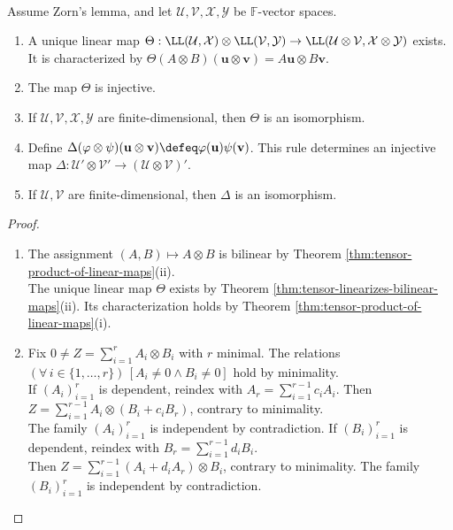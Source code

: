 \begin{theorem} \label{thm:tensor-product-of-map-spaces} \\
Assume Zorn's lemma, and let $\mathcal{U},\mathcal{V},\mathcal{X},\mathcal{Y}$ be $\mathbb{F}$-vector spaces.
\begin{enumerate}[label=(\roman*)]
\setlength{\itemsep}{0pt}
\item A unique linear map $\Theta:\LL(\mathcal{U},\mathcal{X})\otimes\LL(\mathcal{V},\mathcal{Y})\to\LL(\mathcal{U}\otimes\mathcal{V},\mathcal{X}\otimes\mathcal{Y})$ exists. It is characterized by $\Theta(A\otimes B)(\mathbf{u}\otimes\mathbf{v})=A\mathbf{u}\otimes B\mathbf{v}$.
\item The map $\Theta$ is injective.
\item If $\mathcal{U},\mathcal{V},\mathcal{X},\mathcal{Y}$ are finite-dimensional, then $\Theta$ is an isomorphism.
\item Define $\Delta(\varphi\otimes\psi)(\mathbf{u}\otimes\mathbf{v})\defeq\varphi(\mathbf{u})\psi(\mathbf{v})$. This rule determines an injective map $\Delta:\mathcal{U}'\otimes\mathcal{V}'\to(\mathcal{U}\otimes\mathcal{V})'$.
\item If $\mathcal{U},\mathcal{V}$ are finite-dimensional, then $\Delta$ is an isomorphism.
\end{enumerate}
\begin{proof}
\begin{enumerate}[label=(\roman*)]
\setlength{\itemsep}{0pt}
\item The assignment $(A,B)\mapsto A\otimes B$ is bilinear by Theorem \ref{thm:tensor-product-of-linear-maps}(ii).\\
The unique linear map $\Theta$ exists by Theorem \ref{thm:tensor-linearizes-bilinear-maps}(ii). Its characterization holds by Theorem \ref{thm:tensor-product-of-linear-maps}(i).
\item Fix $0\neq Z=\sum\limits_{i=1}^{r}A_i\otimes B_i$ with $r$ minimal. The relations $(\forall\,i\in\{1,\ldots,r\})\,[A_i\neq0\land B_i\neq0]$ hold by minimality.\\
If $(A_i)_{i=1}^{r}$ is dependent, reindex with $A_r=\sum\limits_{i=1}^{r-1}c_iA_i$. Then $Z=\sum\limits_{i=1}^{r-1}A_i\otimes(B_i+c_iB_r)$, contrary to minimality.\\
The family $(A_i)_{i=1}^{r}$ is independent by contradiction. If $(B_i)_{i=1}^{r}$ is dependent, reindex with $B_r=\sum\limits_{i=1}^{r-1}d_iB_i$.\\
Then $Z=\sum\limits_{i=1}^{r-1}(A_i+d_iA_r)\otimes B_i$, contrary to minimality. The family $(B_i)_{i=1}^{r}$ is independent by contradiction.\\

\end{enumerate}
\end{proof}
\end{theorem}
